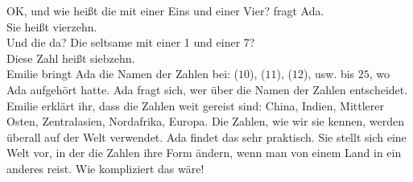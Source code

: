 \frqq{}OK, und wie heißt die mit einer Eins und einer Vier?\flqq{} fragt Ada.\\
\frqq{}Sie heißt vierzehn.\flqq{}\\
\frqq{}Und die da? Die seltsame mit einer 1 und einer 7?\flqq{}\\
\frqq{}Diese Zahl heißt siebzehn.\flqq{}\\ 
Emilie bringt Ada die Namen der Zahlen bei:  ($10$),  ($11$),  ($12$), usw. bis $25$, wo Ada aufgehört hatte. 
Ada fragt sich, wer über die Namen der Zahlen entscheidet. Emilie erklärt ihr, dass die Zahlen weit gereist sind: China, Indien, Mittlerer Osten, Zentralasien, Nordafrika, Europa. 
Die Zahlen, wie wir sie kennen, werden überall auf der Welt verwendet.
Ada findet das sehr praktisch. Sie stellt sich eine Welt vor, in der die Zahlen ihre Form ändern, wenn man von einem Land in ein anderes reist. Wie kompliziert das wäre!

%    
